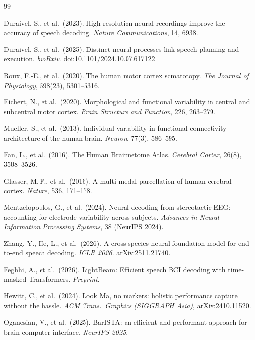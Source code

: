 \documentclass[11pt,letterpaper]{article}
\begin{document}
\begin{thebibliography}{99}\raggedright

Duraivel, S., et al.\ (2023).
High-resolution neural recordings improve the accuracy of speech decoding.
\textit{Nature Communications}, 14, 6938.

Duraivel, S., et al.\ (2025).
Distinct neural processes link speech planning and execution.
\textit{bioRxiv}. doi:10.1101/2024.10.07.617122

Roux, F.-E., et al.\ (2020).
The human motor cortex somatotopy.
\textit{The Journal of Physiology}, 598(23), 5301--5316.

Eichert, N., et al.\ (2020).
Morphological and functional variability in central and subcentral motor cortex.
\textit{Brain Structure and Function}, 226, 263--279.

Mueller, S., et al.\ (2013).
Individual variability in functional connectivity architecture of the human brain.
\textit{Neuron}, 77(3), 586--595.

Fan, L., et al.\ (2016).
The Human Brainnetome Atlas.
\textit{Cerebral Cortex}, 26(8), 3508--3526.

Glasser, M.\,F., et al.\ (2016).
A multi-modal parcellation of human cerebral cortex.
\textit{Nature}, 536, 171--178.

Mentzelopoulos, G., et al.\ (2024).
Neural decoding from stereotactic EEG: accounting for electrode variability across subjects.
\textit{Advances in Neural Information Processing Systems}, 38 (NeurIPS 2024).

Zhang, Y., He, L., et al.\ (2026).
A cross-species neural foundation model for end-to-end speech decoding.
\textit{ICLR 2026}. arXiv:2511.21740.

Feghhi, A., et al.\ (2026).
LightBeam: Efficient speech BCI decoding with time-masked Transformers.
\textit{Preprint}.

Hewitt, C., et al.\ (2024).
Look Ma, no markers: holistic performance capture without the hassle.
\textit{ACM Trans.\ Graphics (SIGGRAPH Asia)}, arXiv:2410.11520.

Oganesian, V., et al.\ (2025).
BarISTA: an efficient and performant approach for brain-computer interface.
\textit{NeurIPS 2025}.


\end{thebibliography}
\end{document}
